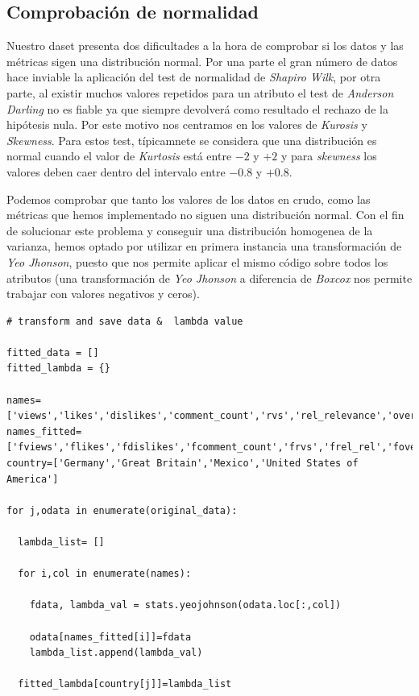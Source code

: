 \documentclass[a4paper,12pt]{article}
\begin{document}
\subsection{Comprobaci\'on de normalidad}

Nuestro daset presenta dos dificultades a la hora de comprobar si los datos y las m\'etricas sigen una distribuci\'on normal. Por una parte el gran n\'umero de datos hace inviable la aplicaci\'on del test de normalidad de {\itshape  Shapiro Wilk}, por otra parte, al existir muchos valores repetidos para un atributo el test de {\itshape Anderson Darling} no es fiable ya que siempre devolver\'a como resultado el rechazo de la hip\'otesis nula. Por este motivo nos centramos en los valores de {\itshape Kurosis} y {\itshape Skewness}. Para estos test, t\'ipicamnete se considera que una distribuci\'on es normal cuando el valor de {\itshape Kurtosis} est\'a entre $-2$ y $+2$ y para {\itshape skewness} los valores deben caer dentro del intervalo entre $-0.8$ y $+0.8$.

Podemos comprobar que tanto los valores de los datos en crudo, como las m\'etricas que hemos implementado no siguen una distribuci\'on normal. Con el fin de solucionar este problema y conseguir una distribuci\'on homogenea de la varianza, hemos optado por utilizar en primera instancia una transformaci\'on de {\itshape Yeo Jhonson}, puesto que nos permite aplicar el mismo c\'odigo sobre todos los atributos (una transformaci\'on de {\itshape Yeo Jhonson} a diferencia de {\itshape Boxcox} nos permite trabajar con valores negativos y ceros).

\begin{verbatim}
# transform and save data &  lambda value 

fitted_data = []
fitted_lambda = {}

names=['views','likes','dislikes','comment_count','rvs','rel_relevance','overall_sentiment_engagement']
names_fitted=['fviews','flikes','fdislikes','fcomment_count','frvs','frel_rel','foverall_sen_eng']
country=['Germany','Great Britain','Mexico','United States of America']

for j,odata in enumerate(original_data):

  lambda_list= []

  for i,col in enumerate(names):
    
    fdata, lambda_val = stats.yeojohnson(odata.loc[:,col])

    odata[names_fitted[i]]=fdata
    lambda_list.append(lambda_val)
  
  fitted_lambda[country[j]]=lambda_list

\end{verbatim}
\end{document}
